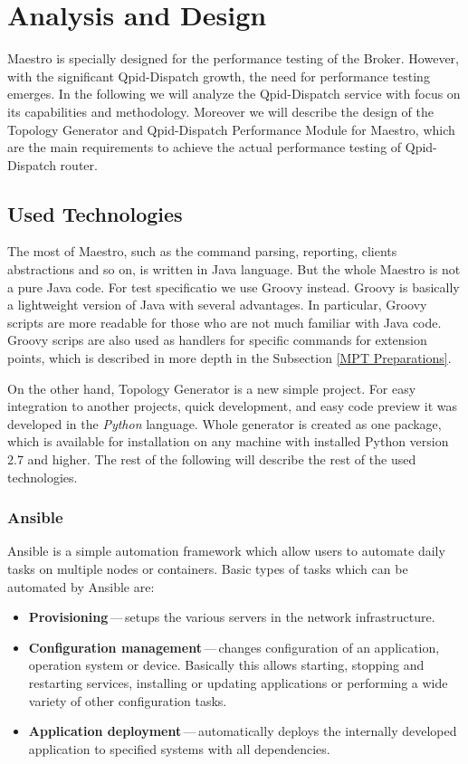 
\chapter{Analysis and Design}
\label{Analysis and Design}
Maestro is specially designed for the performance testing of the Broker. However, with the significant Qpid-Dispatch growth, the need for performance testing emerges. In the following we will analyze the Qpid-Dispatch service with focus on its capabilities and methodology. Moreover we will describe the design of the Topology Generator and Qpid-Dispatch Performance Module for Maestro, which are the main requirements to achieve the actual performance testing of Qpid-Dispatch router.

\section{Used Technologies}
The most of Maestro, such as the command parsing, reporting, clients abstractions and so on, is written in Java language. But the whole Maestro is not a pure Java code. For test specificatio we use Groovy instead. Groovy is basically a lightweight version of Java with several advantages. In particular, Groovy scripts are more readable for those who are not much familiar with Java code. Groovy scrips are also used as handlers for specific commands for extension points, which is described in more depth in the Subsection \ref{MPT Preparations}.

On the other hand, Topology Generator is a new simple project. For easy integration to another projects, quick development, and easy code preview it was developed in the \emph{Python} language. Whole generator is created as one package, which is available for installation on any machine with installed Python version 2.7 and higher. The rest of the following will describe the rest of the used technologies.

\subsection{Ansible}
Ansible \cite{Ansible} is a simple automation framework which allow users to automate daily tasks on multiple nodes or containers. Basic types of tasks which can be automated by Ansible are:

\begin{itemize}
	\item \textbf{Provisioning}\,---\,setups the various servers in the network infrastructure.
	\item \textbf{Configuration management}\,---\,changes configuration of an application, operation system or device. Basically this allows starting, stopping and restarting services, installing or updating applications or performing a wide variety of other configuration tasks.
	\item \textbf{Application deployment}\,---\,automatically deploys the internally developed application to specified systems with all dependencies.
\end{itemize}

